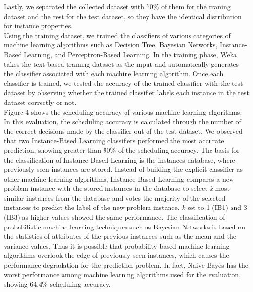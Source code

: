 \documentclass[10pt, conference, compsocconf]{IEEEtran}
\begin{document}
%
Lastly, we separated the collected dataset with 70\% of them for
the traning dataset and the rest for the test dataset, so they have
the identical distribution for instance properties.\\
%
\indent Using the training dataset, 
we trained the classifiers of various categories of machine learning 
algorithms such as Decision Tree, Bayesian Networks, Instance-Based
Learning, and Perceptron-Based Learning.
%
In the training phase, Weka takes the text-based training dataset as
the input and automatically generates the classifier associated with
each machine learning algorithm.
%
Once each classifier is trained, we tested the accuracy of the
trained classifier with the test dataset by observing whether the trained classifier labels each
instance in the test dataset correctly or not.\\
%
\indent Figure 4 shows the scheduling accuracy of various machine learning
algorithms.
%
In this evaluation, the scheduling accuracy is calculated through the
number of the correct decisions made by the classifier out of the test
dataset.
%
We observed that two Instance-Based Learning classifiers performed 
the most accurate prediction, showing greater than 90\% of the scheduling
accuracy.
%
%
The basis for the classification of Instance-Based Learning is the instances 
database, where previously seen instances are stored.
%
Instead of building the explicit classifier as other machine learning
algorithms, Instance-Based Learning compares a new problem instance with the stored
instances in the database to select \textit{k} most similar instances 
from the database and votes the majority of the selected instances to 
predict the label of the new problem instance.
%
\textit{k} set to 1 (IB1) and 3 (IB3) as higher values showed the same
performance. 
%
%
The classification of probabilistic machine learning
techniques such as Bayesian Networks is based on the statistics
of attributes of the previous instances such as the mean and the
variance values.
%
Thus it is possible that probability-based machine learning
algorithms overlook the edge of previously seen instances, which causes
the performance degradation for the prediction problem. 
%
In fact, Naive Bayes has the worst performance among machine learning
algorithms used for the evaluation, showing 64.4\% scheduling
accuracy.
%
\end{document}
